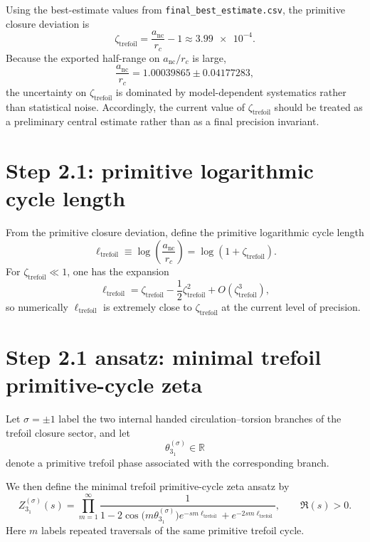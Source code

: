 \documentclass[11pt]{article}
\newcommand{\anc}{a_{\mathrm{nc}}}
\newcommand{\rc}{r_{\!c}}
\newcommand{\zetatrefoil}{\zeta_{\mathrm{trefoil}}}
\newcommand{\elltrefoil}{\ell_{\mathrm{trefoil}}}
\begin{document}
Using the best-estimate values from \texttt{final\_best\_estimate.csv}, the primitive closure deviation is
\begin{equation}
    \zetatrefoil = \frac{\anc}{\rc}-1 \approx \num{3.99e-4}.
\end{equation}
Because the exported half-range on \(\anc/\rc\) is large,
\[
\frac{\anc}{\rc} = \num{1.00039865}\pm\num{0.04177283},
\]
the uncertainty on \(\zetatrefoil\) is dominated by model-dependent systematics rather than statistical noise. Accordingly, the current value of \(\zetatrefoil\) should be treated as a preliminary central estimate rather than as a final precision invariant.

\section{Step 2.1: primitive logarithmic cycle length}

From the primitive closure deviation, define the primitive logarithmic cycle length
\begin{equation}
    \elltrefoil
    \equiv
    \log\!\left(\frac{\anc}{\rc}\right)
    =
    \log(1+\zetatrefoil).
    \label{eq:ell-def}
\end{equation}
For \(\zetatrefoil\ll 1\), one has the expansion
\[
\elltrefoil
=
\zetatrefoil-\frac12\zetatrefoil^2+O(\zetatrefoil^3),
\]
so numerically \(\elltrefoil\) is extremely close to \(\zetatrefoil\) at the current level of precision.

\section{Step 2.1 ansatz: minimal trefoil primitive-cycle zeta}

Let \(\sigma=\pm 1\) label the two internal handed circulation--torsion branches of the trefoil closure sector, and let
\[
\theta_{3_1}^{(\sigma)}\in\mathbb{R}
\]
denote a primitive trefoil phase associated with the corresponding branch.

We then define the minimal trefoil primitive-cycle zeta ansatz by
\begin{equation}
    Z_{3_1}^{(\sigma)}(s)
    =
    \prod_{m=1}^{\infty}
    \frac{1}{
    1
    -2\cos\!\big(m\theta_{3_1}^{(\sigma)}\big)e^{-s m\elltrefoil}
    +e^{-2s m\elltrefoil}
    },
    \qquad
    \Re(s)>0.
    \label{eq:primitive-zeta}
\end{equation}
Here \(m\) labels repeated traversals of the same primitive trefoil cycle.
\end{document}
